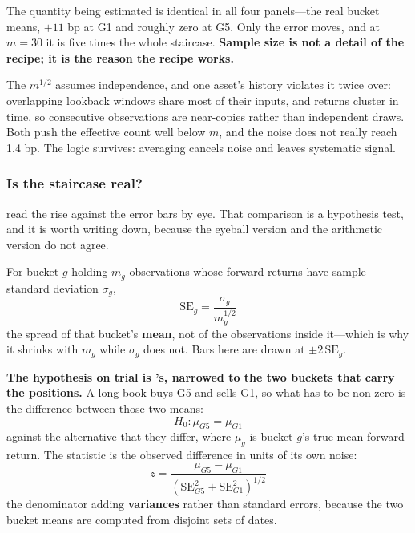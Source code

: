 
The quantity being estimated is identical in all four panels---the real bucket means, $+11$ bp at G1
and roughly zero at G5. Only the error moves, and at $m = 30$ it is five times the whole staircase.
\textbf{Sample size is not a detail of the recipe; it is the reason the recipe works.}

\begin{note}
The $m^{1/2}$ assumes independence, and one asset's history violates it twice over: overlapping
lookback windows share most of their inputs, and returns cluster in time, so consecutive
observations are near-copies rather than independent draws. Both push the effective count well below
$m$, and the noise does not really reach 1.4 bp. The logic survives: averaging cancels noise and
leaves systematic signal.
\end{note}

\subsubsection{Is the staircase real?}\label{sec:staircase-real}

 read the rise against the error bars by eye. That comparison is a
hypothesis test, and it is worth writing down, because the eyeball version and the arithmetic
version do not agree.

\begin{definition}\label{def:se-bucket}
For bucket $g$ holding $m_g$ observations whose forward returns have sample standard deviation
$\sigma_g$,
\[
  \mathrm{SE}_g = \frac{\sigma_g}{m_g^{1/2}}
\]
the spread of that bucket's \textbf{mean}, not of the observations inside it---which is why it
shrinks with $m_g$ while $\sigma_g$ does not. Bars here are drawn at $\pm 2\,\mathrm{SE}_g$.
\end{definition}

\textbf{The hypothesis on trial is 's, narrowed to the two buckets
that carry the positions.} A long book buys G5 and sells G1, so what has to be non-zero is the
difference between those two means:
\[
  H_0: \mu_{G5} = \mu_{G1}
\]
against the alternative that they differ, where $\mu_g$ is bucket $g$'s true mean forward return.
The statistic is the observed difference in units of its own noise:
\[
  z = \frac{\mu_{G5} - \mu_{G1}}{\left( \mathrm{SE}_{G5}^2 + \mathrm{SE}_{G1}^2 \right)^{1/2}}
\]
the denominator adding \textbf{variances} rather than standard errors, because the two bucket means
are computed from disjoint sets of dates.

